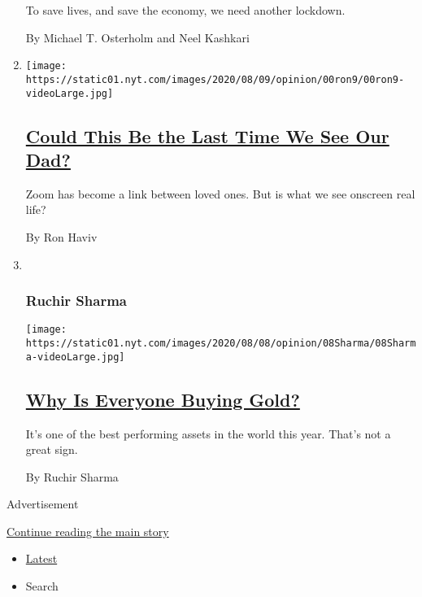 \begin{enumerate}
  To save lives, and save the economy, we need another lockdown.

  By Michael T. Osterholm and Neel Kashkari
\item
  \texttt{[image: https://static01.nyt.com/images/2020/08/09/opinion/00ron9/00ron9-videoLarge.jpg]}

  \hypertarget{could-this-be-the-last-time-we-see-our-dad}{%
  \subsection{\texorpdfstring{\href{/2020/08/06/opinion/sunday/coronavirus-baruch-haviv-death.html}{Could
  This Be the Last Time We See Our
  Dad?}}{Could This Be the Last Time We See Our Dad?}}\label{could-this-be-the-last-time-we-see-our-dad}}

  Zoom has become a link between loved ones. But is what we see onscreen
  real life?

  By Ron Haviv
\item ~
  \hypertarget{ruchir-sharma}{%
  \subsubsection{Ruchir Sharma}\label{ruchir-sharma}}

  \texttt{[image: https://static01.nyt.com/images/2020/08/08/opinion/08Sharma/08Sharma-videoLarge.jpg]}

  \hypertarget{why-is-everyone-buying-gold}{%
  \subsection{\texorpdfstring{\href{/2020/08/08/opinion/gold-investment-coronavirus.html}{Why
  Is Everyone Buying
  Gold?}}{Why Is Everyone Buying Gold?}}\label{why-is-everyone-buying-gold}}

  It's one of the best performing assets in the world this year. That's
  not a great sign.

  By Ruchir Sharma
\end{enumerate}

Advertisement

\protect\hyperlink{after-mid1}{Continue reading the main story}

\begin{itemize}
\tightlist
\item
  \protect\hyperlink{stream-panel}{Latest}
\item
  Search
\end{itemize}

